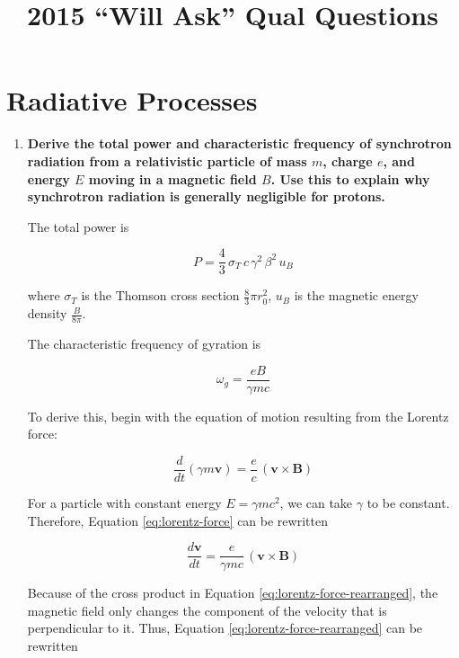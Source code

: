 \documentclass[12pt, letterpaper, preprint]{aastex}
\newcommand{\vel}{\textbf{v}}
\begin{document}
\title{2015 ``Will Ask'' Qual Questions}

\section*{Radiative Processes}

\begin{enumerate}

  \item \textbf{Derive the total power and characteristic frequency 
      of synchrotron radiation from a relativistic particle of mass $m$, 
      charge $e$, and energy $E$ moving in a magnetic field $B$. 
      Use this to explain why synchrotron radiation is generally 
      negligible for protons.}

The total power is

\begin{equation}
  P = \frac{4}{3} \, \sigma_T \, c \, \gamma^2 \, \beta^2 \, u_B
  \label{eq:relativistic-larmor}
\end{equation}

where $\sigma_T$ is the Thomson cross section $\frac{8}{3} \pi r_0^2$,
$u_B$ is the magnetic energy density $\frac{B}{8 \pi}$.

The characteristic frequency of gyration is

\begin{equation}
\omega_g = \frac{eB}{\gamma mc}
\end{equation}

To derive this, begin with the equation of motion resulting from the Lorentz force:

\begin{equation}
  \frac{d}{dt} (\gamma m \vel) = \frac{e}{c} \, (\vel \times \mathbf{B})
  \label{eq:lorentz-force}
\end{equation}

For a particle with constant energy $E = \gamma m c^2$,
we can take $\gamma$ to be constant.
Therefore, Equation \ref{eq:lorentz-force} can be rewritten

\begin{equation}
  \frac{d \vel}{dt} = \frac{e}{\gamma m c} \, (\vel \times \mathbf{B})
  \label{eq:lorentz-force-rearranged}
\end{equation}

Because of the cross product in Equation \ref{eq:lorentz-force-rearranged}, the magnetic field only changes the component of the velocity that is perpendicular to it. Thus, Equation \ref{eq:lorentz-force-rearranged} can be rewritten


\end{enumerate}
\end{document}
